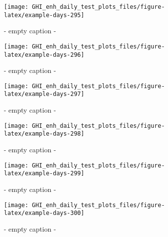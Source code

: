 \documentclass[
  10pt,
  a4paper,oneside]{article}
\begin{document}
\begin{figure}[H]

{\centering \texttt{[image: GHI\_enh\_daily\_test\_plots\_files/figure-latex/example-days-295]} 

}

\caption{ - empty caption - }\label{fig:example-days-295}
\end{figure}

\begin{figure}[H]

{\centering \texttt{[image: GHI\_enh\_daily\_test\_plots\_files/figure-latex/example-days-296]} 

}

\caption{ - empty caption - }\label{fig:example-days-296}
\end{figure}

\begin{figure}[H]

{\centering \texttt{[image: GHI\_enh\_daily\_test\_plots\_files/figure-latex/example-days-297]} 

}

\caption{ - empty caption - }\label{fig:example-days-297}
\end{figure}

\begin{figure}[H]

{\centering \texttt{[image: GHI\_enh\_daily\_test\_plots\_files/figure-latex/example-days-298]} 

}

\caption{ - empty caption - }\label{fig:example-days-298}
\end{figure}

\begin{figure}[H]

{\centering \texttt{[image: GHI\_enh\_daily\_test\_plots\_files/figure-latex/example-days-299]} 

}

\caption{ - empty caption - }\label{fig:example-days-299}
\end{figure}

\begin{figure}[H]

{\centering \texttt{[image: GHI\_enh\_daily\_test\_plots\_files/figure-latex/example-days-300]} 

}

\caption{ - empty caption - }\label{fig:example-days-300}
\end{figure}
\end{document}
